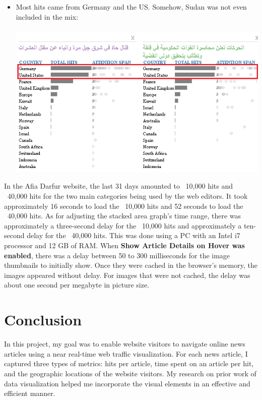 \documentclass[12pt]{article}
\begin{document}
{\begin{itemize}
\item Most hits came from Germany and the US. Somehow, Sudan was not even included in the mix: \\ \\
\noindent\includegraphics[scale=0.7]{img/obz3}
 
\end{itemize}

\newpage

In the Afia Darfur website, the last 31 days amounted to ~10,000 hits and ~40,000 hits for the two main categories being used by the web editors. It took approximately 16 seconds to load the ~10,000 hits and 52 seconds to load the ~40,000 hits. As for adjusting the stacked area graph's time range, there was approximately a three-second delay for the ~10,000 hits and approximately a ten-second delay for the ~40,000 hits. This was done using a PC with an Intel i7 processor and 12 GB of RAM. When \textbf{Show Article Details on Hover was enabled}, there was a delay between 50 to 300 milliseconds for the image thumbnails to initially show. Once they were cached in the browser's memory, the images appeared without delay. For images that were not cached, the delay was about one second per megabyte in picture size.


\newpage

\section{Conclusion}
In this project, my goal was to enable website visitors to navigate online news articles using a near real-time web traffic visualization. For each news article, I captured three types of metrics: hits per article, time spent on an article per hit, and the geographic locations of the website visitors. My research on prior work of data visualization helped me incorporate the visual elements in an effective and efficient manner. \\ 

}
\end{document}
